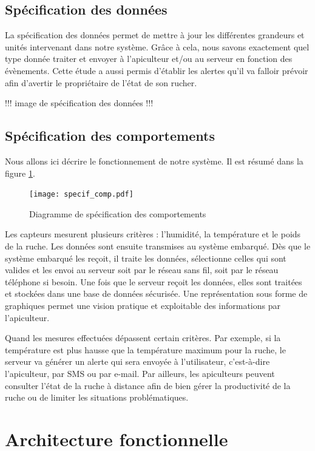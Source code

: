 \section{Spécification des données}
La spécification des données permet de mettre à jour les différentes grandeurs 
et unités intervenant dans notre système. Grâce à cela, nous savons exactement 
quel type donnée traiter et envoyer à l'apiculteur et/ou au serveur en fonction des évènements. Cette étude a aussi permis d'établir les alertes qu'il va falloir prévoir afin d'avertir le propriétaire de l'état de son rucher. 

!!!  image de spécification des données  !!!

\section{Spécification des comportements}

Nous allons ici décrire le fonctionnement de notre système. Il est résumé dans la figure \ref{fig:sp_comp}.

\begin{figure}[h!]
\centering\texttt{[image: specif\_comp.pdf]}
\caption{\label{fig:sp_comp} Diagramme de spécification des comportements}
\end{figure}

Les capteurs mesurent plusieurs critères : l'humidité, la température et le poids de la ruche. Les données sont ensuite transmises au système embarqué. Dès que le système embarqué les reçoit, il traite les données, sélectionne celles qui sont valides et les envoi au serveur soit par le réseau sans fil, soit par le réseau téléphone si besoin. Une fois que le serveur reçoit les données, elles sont traitées et stockées dans une base de données sécurisée. Une représentation sous forme de graphiques permet une vision pratique et exploitable des informations par l'apiculteur.

Quand les mesures effectuées dépassent certain critères. Par exemple, si la température est plus hausse que la température maximum pour la ruche, le serveur va générer un alerte qui sera envoyée à l'utilisateur, c’est-à-dire l'apiculteur, par SMS ou par e-mail. Par ailleurs, les apiculteurs peuvent consulter l’état de la ruche à distance afin de bien gérer la productivité de la ruche ou de limiter les situations problématiques. 

\pagebreak

\chapter{Architecture fonctionnelle}


